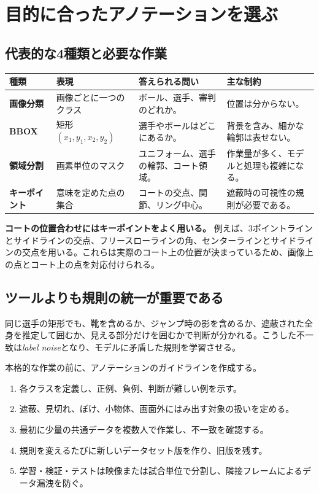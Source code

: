 \documentclass[11pt,a4paper,oneside]{report}
\newcommand{\eng}[1]{\textit{#1}}
\begin{document}
\section{目的に合ったアノテーションを選ぶ}

\subsection{代表的な4種類と必要な作業}

\begin{tabularx}{\textwidth}{>{\bfseries\RaggedRight}p{2.7cm} Y Y Y}
\toprule
種類 & 表現 & 答えられる問い & 主な制約 \\
\midrule
画像分類 & 画像ごとに一つのクラス & ボール、選手、審判のどれか。 & 位置は分からない。\\
BBOX & 矩形 $(x_1,y_1,x_2,y_2)$ & 選手やボールはどこにあるか。 & 背景を含み、細かな輪郭は表せない。\\
領域分割 & 画素単位のマスク & ユニフォーム、選手の輪郭、コート領域。 & 作業量が多く、モデルと処理も複雑になる。\\
キーポイント & 意味を定めた点の集合 & コートの交点、関節、リング中心。 & 遮蔽時の可視性の規則が必要である。\\
\bottomrule
\end{tabularx}

\begin{plainBox}
\textbf{コートの位置合わせにはキーポイントをよく用いる。}\quad
例えば、3ポイントラインとサイドラインの交点、フリースローラインの角、センターラインとサイドラインの交点を用いる。これらは実際のコート上の位置が決まっているため、画像上の点とコート上の点を対応付けられる。
\end{plainBox}

\subsection{ツールよりも規則の統一が重要である}

同じ選手の矩形でも、靴を含めるか、ジャンプ時の影を含めるか、遮蔽された全身を推定して囲むか、見える部分だけを囲むかで判断が分かれる。こうした不一致は\eng{label noise}となり、モデルに矛盾した規則を学習させる。

本格的な作業の前に、アノテーションのガイドラインを作成する。

\begin{enumerate}
  \item 各クラスを定義し、正例、負例、判断が難しい例を示す。
  \item 遮蔽、見切れ、ぼけ、小物体、画面外にはみ出す対象の扱いを定める。
  \item 最初に少量の共通データを複数人で作業し、不一致を確認する。
  \item 規則を変えるたびに新しいデータセット版を作り、旧版を残す。
  \item 学習・検証・テストは映像または試合単位で分割し、隣接フレームによるデータ漏洩を防ぐ。
\end{enumerate}
\end{document}
